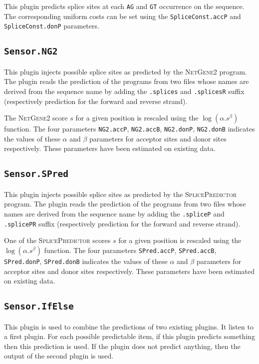 \documentclass[a4paper,titlepage]{report}
\begin{document}
This plugin predicts splice sites at each \texttt{AG} and \texttt{GT}
occurrence on the sequence. The corresponding uniform costs can be set
using the \texttt{SpliceConst.accP} and \texttt{SpliceConst.donP}
parameters.

\subsection{\texttt{Sensor.NG2}}

This plugin injects possible splice sites as predicted by the
\textsc{NetGene2} program. The plugin reads the prediction of the
programs from two files whose names are derived from the sequence name
by adding the \texttt{.splices} and \texttt{.splicesR} suffix
(respectively prediction for the forward and reverse strand).

The \textsc{NetGene2} score $s$ for a given position is rescaled using
the $\log(\alpha.s^\beta)$ function. The four parameters \texttt{NG2.accP},
\texttt{NG2.accB}, \texttt{NG2.donP}, \texttt{NG2.donB}
indicates the values of these $\alpha$ and $\beta$ parameters for
acceptor sites and donor sites respectively. These parameters have
been estimated on existing data.

\subsection{\texttt{Sensor.SPred}}

This plugin injects possible splice sites as predicted by the
\textsc{SplicePredictor} program. The plugin reads the prediction of
the programs from two files whose names are derived from the sequence
name by adding the \texttt{.spliceP} and \texttt{.splicePR} suffix
(respectively prediction for the forward and reverse strand).

One of the \textsc{SplicePredictor} scores $s$ for a given position is
rescaled using the $\log(\alpha.s^\beta)$ function. The four parameters
\texttt{SPred.accP}, \texttt{SPred.accB}, \texttt{SPred.donP},
\texttt{SPred.donB} indicates the values of these $\alpha$ and $\beta$
parameters for acceptor sites and donor sites respectively.  These
parameters have been estimated on existing data.

\subsection{\texttt{Sensor.IfElse}}

This plugin is used to combine the predictions of two existing
plugins. It listen to a first plugin. For each possible predictable
item, if this plugin predicts something then this prediction is used.
If the plugin does not predict anything, then the output of the second
plugin is used.
 
\end{document}
